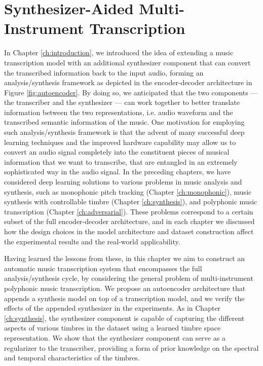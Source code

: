 
\graphicspath{{7-timbre/figures/}}

\chapter{Synthesizer-Aided Multi-Instrument Transcription}
\label{ch:timbre}

In Chapter \ref{ch:introduction}, we introduced the idea of extending a music transcription model with an additional synthesizer component that can convert the transcribed information back to the input audio, forming an analysis/synthesis framework as depicted in the encoder-decoder architecture in Figure \ref{fig:autoencoder}.
By doing so, we anticipated that the two components --- the transcriber and the synthesizer --- can work together to better translate information between the two representations, i.e. audio waveform and the transcribed semantic information of the music.
One motivation for employing such analysis/synthesis framework is that the advent of many successful deep learning techniques and the improved hardware capability may allow us to convert an audio signal completely into the constituent pieces of musical information that we want to transcribe, that are entangled in an extremely sophisticated way in the audio signal.
In the preceding chapters, we have considered deep learning solutions to various problems in music analysis and synthesis, such as monophonic pitch tracking (Chapter \ref{ch:monophonic}), music synthesis with controllable timbre (Chapter \ref{ch:synthesis}), and polyphonic music transcription (Chapter \ref{ch:adversarial}).
These problems correspond to a certain subset of the full encoder-decoder architecture, and in each chapter we discussed how the design choices in the model architecture and dataset construction affect the experimental results and the real-world applicability.

Having learned the lessons from these, in this chapter we aim to construct an automatic music transcription system that encompasses the full analysis/synthesis cycle, by considering the general problem of multi-instrument polyphonic music transcription.
We propose an autoencoder architecture that appends a synthesis model on top of a transcription model, and we verify the effects of the appended synthesizer in the experiments.
As in Chapter \ref{ch:synthesis}, the synthesizer component is capable of capturing the different aspects of various timbres in the dataset using a learned timbre space representation.
We show that the synthesizer component can serve as a regularizer to the transcriber, providing a form of prior knowledge on the spectral and temporal characteristics of the timbres. 

